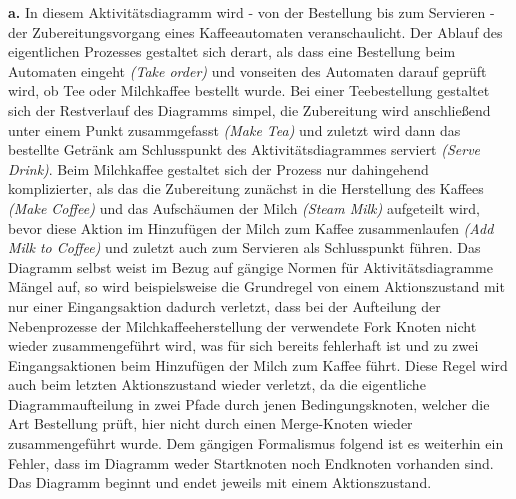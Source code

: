 \documentclass{swp1}
\begin{document}
\textbf{a.}\newline
\newline
In diesem Aktivitätsdiagramm wird - von der Bestellung bis zum Servieren - der Zubereitungsvorgang eines Kaffeeautomaten veranschaulicht.\newline
\newline
Der Ablauf des eigentlichen Prozesses gestaltet sich derart, als dass eine Bestellung beim Automaten eingeht \emph{(Take order)} und vonseiten des Automaten darauf geprüft wird, ob Tee oder Milchkaffee bestellt wurde.\newline
Bei einer Teebestellung gestaltet sich der Restverlauf des Diagramms simpel, die Zubereitung wird anschließend unter einem Punkt zusammgefasst \emph{(Make Tea)} und zuletzt wird dann das bestellte Getränk am Schlusspunkt des Aktivitätsdiagrammes serviert \emph{(Serve Drink)}.\newline
Beim Milchkaffee gestaltet sich der Prozess nur dahingehend komplizierter, als das die Zubereitung zunächst in die Herstellung des Kaffees \emph{(Make Coffee)} und das Aufschäumen der Milch \emph{(Steam Milk)} aufgeteilt wird, bevor diese Aktion im Hinzufügen der Milch zum Kaffee zusammenlaufen \emph{(Add Milk to Coffee)} und zuletzt auch zum Servieren als Schlusspunkt führen.\newline
\newline
Das Diagramm selbst weist im Bezug auf gängige Normen für Aktivitätsdiagramme Mängel auf, so wird beispielsweise die Grundregel von einem Aktionszustand mit nur einer Eingangsaktion dadurch verletzt, dass bei der Aufteilung der Nebenprozesse der Milchkaffeeherstellung der verwendete Fork Knoten nicht wieder zusammengeführt wird, was für sich bereits fehlerhaft ist und zu zwei Eingangsaktionen beim Hinzufügen der Milch zum Kaffee führt.
Diese Regel wird auch beim letzten Aktionszustand wieder verletzt, da die eigentliche Diagrammaufteilung in zwei Pfade durch jenen Bedingungsknoten, welcher die Art Bestellung prüft, hier nicht durch einen Merge-Knoten wieder zusammengeführt wurde.\newline
Dem gängigen Formalismus folgend ist es weiterhin ein Fehler, dass im Diagramm weder Startknoten noch Endknoten vorhanden sind. Das Diagramm beginnt und endet jeweils mit einem Aktionszustand.


\clearpage
\end{document}
